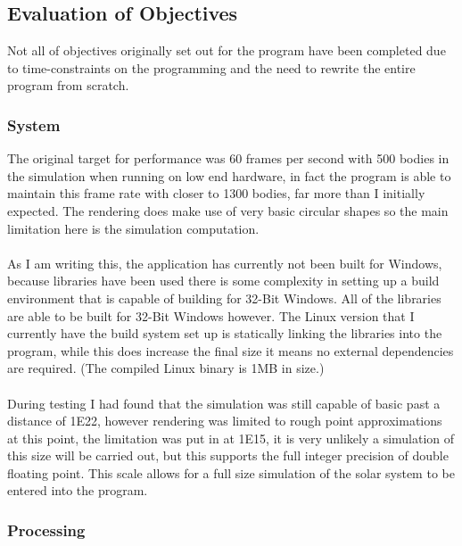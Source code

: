 \subsection{Evaluation of Objectives}
Not all of objectives originally set out for the program have been completed due to time-constraints on the programming and the need to rewrite the entire program from scratch.

\subsubsection{System}
The original target for performance was 60 frames per second with 500 bodies in the simulation when running on low end hardware, in fact the program is able to maintain this frame rate with closer to 1300 bodies, far more than I initially expected. The rendering does make use of very basic circular shapes so the main limitation here is the simulation computation.

\paragraph{}
As I am writing this, the application has currently not been built for Windows, because libraries have been used there is some complexity in setting up a build environment that is capable of building for 32-Bit Windows. All of the libraries are able to be built for 32-Bit Windows however. The Linux version that I currently have the build system set up is statically linking the libraries into the program, while this does increase the final size it means no external dependencies are required. (The compiled Linux binary is 1MB in size.)

\paragraph{}
During testing I had found that the simulation was still capable of basic past a distance of 1E22, however rendering was limited to rough point approximations at this point, the limitation was put in at 1E15, it is very unlikely a simulation of this size will be carried out, but this supports the full integer precision of double floating point. This scale allows for a full size simulation of the solar system to be entered into the program.

\subsubsection{Processing}

